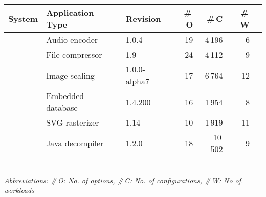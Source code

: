 \begin{tabular}{lllrrrr}
		\toprule
		\textbf{System} &  \textbf{Application Type} & \textbf{Revision} & \textbf{ \#\,O} & \textbf{\#\,C} & \textbf{\#\,W}  \\
		\midrule
		\jumper & Audio encoder & 1.0.4 & 19 & 4\,196 & 6   \\
		
		\kanzi & File compressor & 1.9 & 24 & 4\,112 & 9 \\
			
		\dconvert & Image scaling & 1.0.0-alpha7 & 17 & 6\,764 & 12  \\
				
		\htwo & Embedded database & 1.4.200 & 16 & 1\,954  & 8  \\
		
		\batik & SVG rasterizer & 1.14 & 10 & 1\,919 &  11  \\
		
		\jadx & Java decompiler & 1.2.0 & 18 & 10\,502 & 9  \\
\bottomrule

\end{tabular}\\
{\vspace{1mm}\textit{Abbreviations: \#\,O: No. of options, \#\,C: No. of configurations, \#\,W: No of. workloads}}
